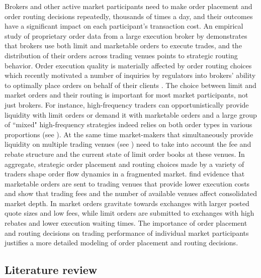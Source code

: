 \documentclass[opre,nonblindrev]{informs3}
\begin{document}
Brokers and other active market participants need to make order placement and order routing decisions repeatedly, thousands of times a day, and their outcomes have a significant impact on each participant's transaction cost. An empirical study of proprietary order data from a large execution broker by \citet{Battalio2013} demonstrates that brokers use both limit and marketable orders to execute trades, and the distribution of their orders across trading venues points to strategic routing behavior. Order execution quality is materially affected by order routing choices which recently motivated a number of inquiries by regulators into brokers' ability to optimally place orders on behalf of their clients \citep{USSenate2014,Reuters2014,Bloomberg2014}. The choice between limit and market orders and their routing is important for most market participants, not just brokers. For instance, high-frequency traders can opportunistically provide liquidity with limit orders or demand it with marketable orders and a large group of ``mixed" high-frequency strategies indeed relies on both order types in various proportions (see \citet{Baron2012, Brogaard2014}). At the same time market-makers that simultaneously provide liquidity on multiple trading venues (see \citet{Menkveld2011}) need to take into account the fee and rebate structure and the current state of limit order books at these venues. In aggregate, strategic order placement and routing choices made by a variety of traders shape order flow dynamics in a fragmented market. \citet{Boehmer2006} find evidence that marketable orders are sent to trading venues that provide lower execution costs and \citet{Foucault2008} show that trading fees and the number of available venues affect consolidated market depth. In \citet{Moallemi2011} market orders gravitate towards exchanges with larger posted quote sizes and low fees, while limit orders are submitted to exchanges with high rebates and lower execution waiting times. The importance of order placement and routing decisions on trading performance of individual market participants justifies a more detailed modeling of  order placement and routing decisions.

\subsection{Literature review}
\end{document}
